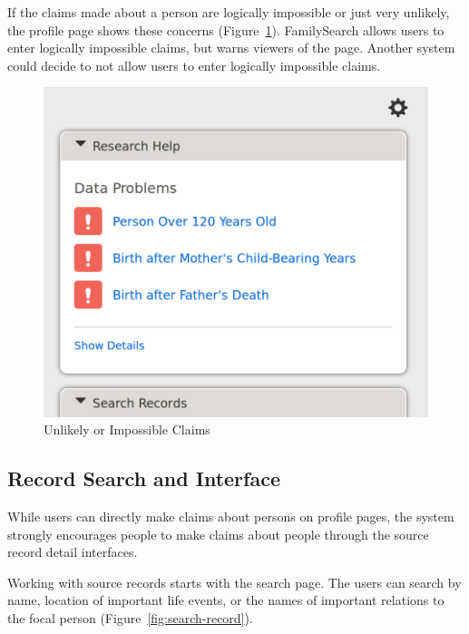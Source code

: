 \documentclass[format=siggraph, review=true]{acmart}
\begin{document}
If the claims made about a person are logically impossible or just
very unlikely, the profile page shows these concerns
(Figure~\ref{fig:data-problems}). FamilySearch allows users to
enter logically impossible claims, but warns viewers of the
page. Another system could decide to not allow users to enter
logically impossible claims.

\begin{figure}[h]
\includegraphics[width=\columnwidth]{images/familysearch/data_problems_detail.png}
\caption{Unlikely or Impossible Claims}
\label{fig:data-problems}
\end{figure}

\subsection*{Record Search and Interface}
While users can directly make claims about persons on profile pages,
the system strongly encourages people to make claims about people
through the source record detail interfaces.

Working with source records starts with the search page. The users can
search by name, location of important life events, or the names of
important relations to the focal person
(Figure~\ref{fig:search-record}).
\end{document}
